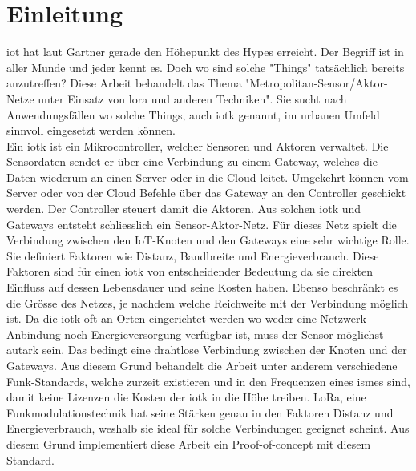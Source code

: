 \chapter{Einleitung}

\acrfull{iot} hat laut Gartner\autocite{gartner:iotHype} gerade den Höhepunkt des Hypes erreicht. Der Begriff ist in aller Munde und jeder kennt es. Doch wo sind solche "Things" tatsächlich bereits anzutreffen? Diese Arbeit behandelt das Thema "Metropolitan-Sensor/Aktor-Netze unter Einsatz von \gls{lora} und anderen Techniken". Sie sucht nach Anwendungsfällen wo solche Things, auch \gls{iotk} genannt, im urbanen Umfeld sinnvoll eingesetzt werden können.\\
Ein \gls{iotk} ist ein Mikrocontroller, welcher Sensoren und Aktoren verwaltet. Die Sensordaten sendet er über eine Verbindung zu einem Gateway, welches die Daten wiederum an einen Server oder in die Cloud leitet. Umgekehrt können vom Server oder von der Cloud Befehle über das Gateway an den Controller geschickt werden. Der Controller steuert damit die Aktoren. Aus solchen \gls{iotk} und  Gateways entsteht schliesslich ein Sensor-Aktor-Netz. Für dieses Netz spielt die Verbindung zwischen den IoT-Knoten und den Gateways eine sehr wichtige Rolle. Sie definiert Faktoren wie Distanz, Bandbreite und Energieverbrauch. Diese Faktoren sind für einen \gls{iotk} von entscheidender Bedeutung da sie direkten Einfluss auf dessen Lebensdauer und seine Kosten haben. Ebenso beschränkt es die Grösse des Netzes, je nachdem welche Reichweite mit der Verbindung möglich ist. Da die \gls{iotk} oft an Orten eingerichtet werden wo weder eine Netzwerk-Anbindung noch Energieversorgung verfügbar ist, muss der Sensor möglichst autark sein. Das bedingt eine drahtlose Verbindung zwischen der Knoten und der Gateways. Aus diesem Grund behandelt die Arbeit unter anderem verschiedene Funk-Standards, welche zurzeit existieren und in den Frequenzen eines \gls{ism}es sind, damit keine Lizenzen die Kosten der \gls{iotk} in die Höhe treiben. LoRa, eine Funkmodulationstechnik hat seine Stärken genau in den Faktoren Distanz und Energieverbrauch, weshalb sie ideal für solche Verbindungen geeignet scheint. Aus diesem Grund implementiert diese Arbeit ein Proof-of-concept mit diesem Standard. 